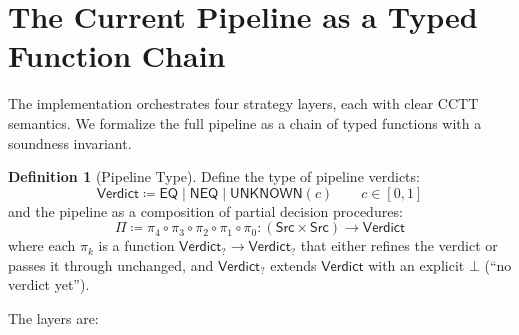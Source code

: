 \documentclass[11pt,a4paper]{report}
\theoremstyle{definition}
\newtheorem{definition}{Definition}[chapter]
\theoremstyle{plain}
\begin{document}
\section{The Current Pipeline as a Typed Function Chain}
\label{sec:current-pipeline}

The implementation orchestrates four strategy layers, each with
clear CCTT semantics.  We formalize the full pipeline as a chain
of typed functions with a soundness invariant.

\begin{definition}[Pipeline Type]
\label{def:pipeline-type}
Define the type of pipeline verdicts:
\[
  \mathsf{Verdict} \coloneqq \mathsf{EQ} \mid \mathsf{NEQ} \mid
  \mathsf{UNKNOWN}(c)
  \qquad c \in [0,1]
\]
and the pipeline as a composition of partial decision procedures:
\[
  \Pi \coloneqq \pi_4 \circ \pi_3 \circ \pi_2 \circ \pi_1 \circ \pi_0
  : (\mathsf{Src} \times \mathsf{Src}) \to \mathsf{Verdict}
\]
where each $\pi_k$ is a function
$\mathsf{Verdict}_? \to \mathsf{Verdict}_?$
that either refines the verdict or passes it through unchanged,
and $\mathsf{Verdict}_?$ extends $\mathsf{Verdict}$ with an
explicit $\bot$ (``no verdict yet'').
\end{definition}

The layers are:
\end{document}

